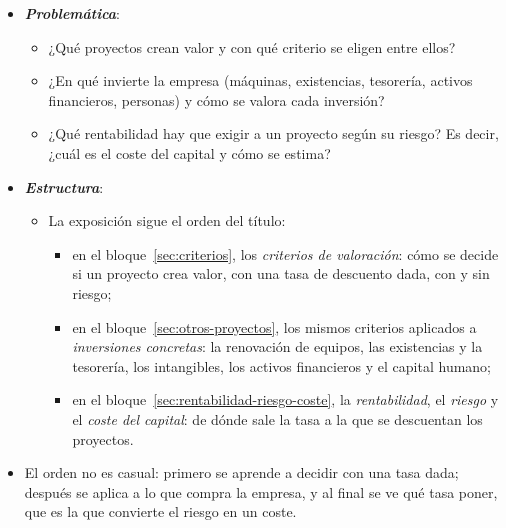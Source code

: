\documentclass[11pt]{article}
\begin{document}
\begin{itemize}
\item \textbf{\emph{Problemática}}:
  \begin{itemize}
  \item ¿Qué proyectos crean valor y con qué criterio se eligen entre ellos?
  \item ¿En qué invierte la empresa (máquinas, existencias, tesorería, activos financieros, personas) y cómo se valora cada inversión?
  \item ¿Qué rentabilidad hay que exigir a un proyecto según su riesgo? Es decir, ¿cuál es el coste del capital y cómo se estima?
  \end{itemize}

\item \textbf{\emph{Estructura}}:
  \begin{itemize}
  \item La exposición sigue el orden del título:
  \begin{itemize}
  \item en el bloque~\ref{sec:criterios}, los \emph{criterios de valoración}: cómo se decide si un proyecto crea valor, con una tasa de descuento dada, con y sin riesgo;
  \item en el bloque~\ref{sec:otros-proyectos}, los mismos criterios aplicados a \emph{inversiones concretas}: la renovación de equipos, las existencias y la tesorería, los intangibles, los activos financieros y el capital humano;
  \item en el bloque~\ref{sec:rentabilidad-riesgo-coste}, la \emph{rentabilidad}, el \emph{riesgo} y el \emph{coste del capital}: de dónde sale la tasa a la que se descuentan los proyectos.
  \end{itemize}
  \end{itemize}
\item El orden no es casual: primero se aprende a decidir con una tasa dada; después se aplica a lo que compra la empresa, y al final se ve qué tasa poner, que es la que convierte el riesgo en un coste.
\end{itemize}
\end{document}
